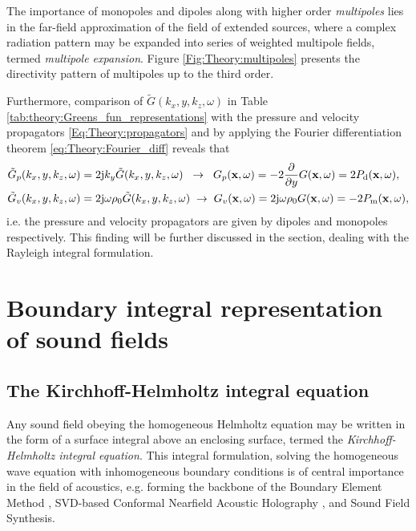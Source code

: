 The importance of monopoles and dipoles along with higher order \emph{multipoles} lies in the far-field approximation of the field of extended sources,
where a complex radiation pattern may be expanded into series of weighted multipole fields, termed \emph{multipole expansion}.
Figure \ref{Fig:Theory:multipoles} presents the directivity pattern of multipoles up to the third order.

Furthermore, comparison of $\tilde{G}(k_x,y,k_z,\omega)$ in Table \ref{tab:theory:Greens_fun_representations}  with the pressure and velocity propagators \eqref{Eq:Theory:propagators} and by applying the Fourier differentiation theorem \eqref{eq:Theory:Fourier_diff} reveals that
\begin{align}
\tilde{G}_p(k_x,y,k_z,\omega) &=  2 \mathrm{j} k_y \tilde{G}(k_x,y,k_z,\omega) 
\hspace{2mm} \rightarrow \hspace{2mm} 
G_p(\mathbf{x},\omega) = -2 \frac{\partial}{\partial y} G(\mathbf{x},\omega) = 2 P_{\mathrm{d}}(\mathbf{x},\omega),
\\
\tilde{G}_v(k_x,y,k_z,\omega) &=  2 \mathrm{j} \omega \rho_0 \tilde{G}(k_x,y,k_z,\omega) 
\hspace{1mm} \rightarrow \hspace{1mm} 
G_v(\mathbf{x},\omega) = 2 \mathrm{j} \omega \rho_0 G(\mathbf{x},\omega) = -2P_{\mathrm{m}}(\mathbf{x},\omega),
\end{align}
i.e. the pressure and velocity propagators are given by dipoles and monopoles respectively.
This finding will be further discussed in the section, dealing with the Rayleigh integral formulation.

\section{Boundary integral representation of sound fields}

\subsection{The Kirchhoff-Helmholtz integral equation}
Any sound field obeying the homogeneous Helmholtz equation may be written in the form of a surface integral above an enclosing surface, termed the \emph{Kirchhoff-Helmholtz integral equation}. 
This integral formulation, solving the homogeneous wave equation with inhomogeneous boundary conditions is of central importance in the field of acoustics, e.g. forming the backbone of the Boundary Element Method \cite{Kirkup2007, Marburg2008}, SVD-based Conformal Nearfield Acoustic Holography \cite{Williams1999, Bai1992, Wu2010}, and Sound Field Synthesis.

